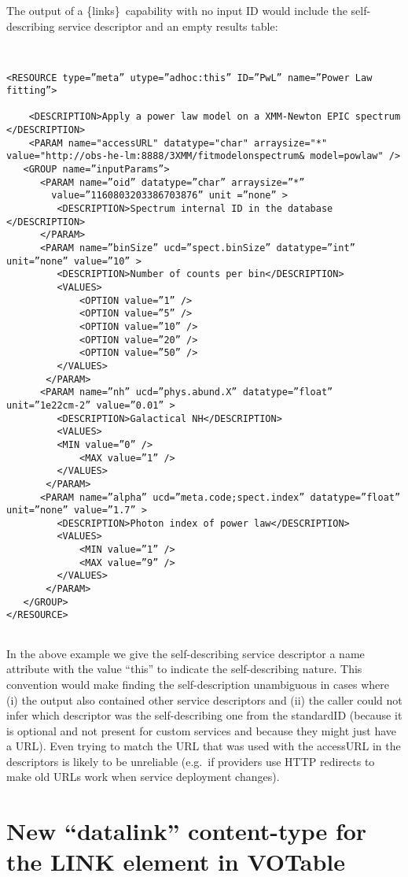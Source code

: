 \documentclass[11pt,a4paper]{ivoa}
\newcommand{\blinks}{\{links\}}
\begin{document}
The output of a \blinks\ capability with no input ID would include the
self-describing service descriptor and an empty results table:
\begin{verbatim}


<RESOURCE type=”meta” utype=”adhoc:this” ID=”PwL” name=”Power Law fitting”>

    <DESCRIPTION>Apply a power law model on a XMM-Newton EPIC spectrum </DESCRIPTION>	
	<PARAM name="accessURL" datatype="char" arraysize="*" value="http://obs-he-lm:8888/3XMM/fitmodelonspectrum& model=powlaw" />
   <GROUP name=”inputParams”>
      <PARAM name=”oid” datatype=”char” arraysize=”*” 
        value=”1160803203386703876” unit =”none” >
         <DESCRIPTION>Spectrum internal ID in the database </DESCRIPTION>
      </PARAM>
      <PARAM name=”binSize” ucd=”spect.binSize” datatype=”int” unit=”none” value=”10” >
         <DESCRIPTION>Number of counts per bin</DESCRIPTION>
         <VALUES>
             <OPTION value=”1” />
             <OPTION value=”5” />
             <OPTION value=”10” />
             <OPTION value=”20” />
             <OPTION value=”50” />
         </VALUES>
       </PARAM>
      <PARAM name=”nh” ucd=”phys.abund.X” datatype=”float” unit=”1e22cm-2” value=”0.01” >
         <DESCRIPTION>Galactical NH</DESCRIPTION>
         <VALUES>
         <MIN value=”0” />
             <MAX value=”1” />
         </VALUES>
       </PARAM>
      <PARAM name=”alpha” ucd=”meta.code;spect.index” datatype=”float” unit=”none” value=”1.7” >
         <DESCRIPTION>Photon index of power law</DESCRIPTION>
         <VALUES>
             <MIN value=”1” />
             <MAX value=”9” />
         </VALUES>
       </PARAM>
   </GROUP>
</RESOURCE>


\end{verbatim}

In the above example we give the self-describing service descriptor a
name attribute with the value ``this'' to indicate the self-describing
nature. This convention would make finding the self-description
unambiguous in cases where (i) the output also contained other service
descriptors and (ii) the caller could not infer which descriptor was
the self-describing one from the standardID (because it is optional
and not present for custom services and because they might just have a
URL). Even trying to match the URL that was used with the accessURL in
the descriptors is likely to be unreliable (e.g.\ if providers use HTTP
redirects to make old URLs work when service deployment changes).

\section{New “datalink” content-type for the LINK element in VOTable}
\end{document}
